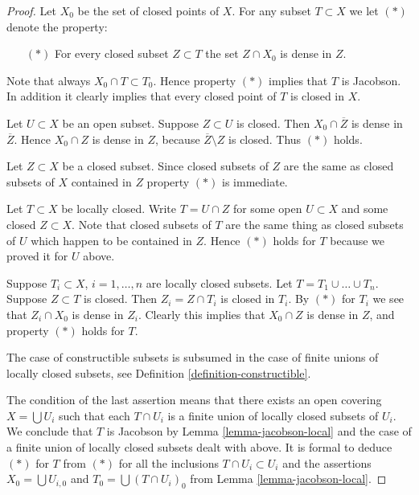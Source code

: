 \begin{proof}
Let $X_0$ be the set of closed points of $X$. For any subset
$T \subset X$ we let $(*)$ denote the property:
\begin{itemize}
\item[$(*)$] For every closed subset $Z \subset T$ the set $Z\cap X_0$
is dense in $Z$.
\end{itemize}
Note that always $X_0 \cap T \subset T_0$. Hence property $(*)$
implies that $T$ is Jacobson. In addition it clearly implies
that every closed point of $T$ is closed in $X$.

\medskip\noindent
Let $U \subset X$ be an open subset.
Suppose $Z \subset U$ is closed. Then $X_0 \cap \overline{Z}$ is
dense in $\overline{Z}$. Hence $X_0 \cap Z$ is dense in $Z$, because
$\overline{Z} \setminus Z$ is closed. Thus $(*)$ holds.

\medskip\noindent
Let $Z \subset X$ be a closed subset.
Since closed subsets of $Z$ are the same as closed subsets of
$X$ contained in $Z$ property $(*)$ is immediate.

\medskip\noindent
Let $T \subset X$ be locally closed. Write $T = U \cap Z$
for some open $U \subset X$ and some closed $Z \subset X$.
Note that closed subsets of $T$ are the same thing as
closed subsets of $U$ which happen to be contained in $Z$.
Hence $(*)$ holds for $T$ because we proved it for $U$ above.

\medskip\noindent
Suppose $T_i \subset X$, $i = 1, \ldots, n$ are locally closed subsets. Let
$T = T_1 \cup \ldots \cup T_n$. Suppose $Z \subset T$ is closed.
Then $Z_i = Z\cap T_i$ is closed in $T_i$. By $(*)$ for $T_i$ we see that
$Z_i \cap X_0$ is dense in $Z_i$. Clearly this implies that
$X_0 \cap Z$ is dense in $Z$, and property $(*)$ holds for
$T$.

\medskip\noindent
The case of constructible subsets is subsumed in the case
of finite unions of locally closed subsets, see Definition
\ref{definition-constructible}.

\medskip\noindent
The condition of the last assertion means that there exists
an open covering $X = \bigcup U_i$ such that each $T \cap U_i$
is a finite union of locally closed subsets of $U_i$. We conclude
that $T$ is Jacobson by Lemma \ref{lemma-jacobson-local} and the
case of a finite union of locally closed subsets dealt with above.
It is formal to deduce $(*)$ for $T$ from $(*)$ for all the inclusions
$T \cap U_i \subset U_i$ and the assertions $X_0 = \bigcup U_{i, 0}$
and $T_0 = \bigcup (T\cap U_i)_0$ from Lemma \ref{lemma-jacobson-local}.
\end{proof}

